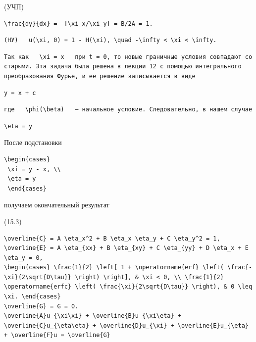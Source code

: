 \documentclass[
  ukrainian,
]{article}
\begin{document}
(УЧП)

\begin{verbatim}
\frac{dy}{dx} = -[\xi_x/\xi_y] = B/2A = 1.
\end{verbatim}

\begin{verbatim}
(НУ)   u(\xi, 0) = 1 - H(\xi), \quad -\infty < \xi < \infty.
\end{verbatim}

\begin{verbatim}
Так как   \xi = x   при t = 0, то новые граничные условия совпадают со старыми. Эта задача была решена в лекции 12 с помощью интегрального преобразования Фурье, и ее решение записывается в виде
\end{verbatim}

\begin{verbatim}
y = x + c
\end{verbatim}

\begin{verbatim}
где   \phi(\beta)   — начальное условие. Следовательно, в нашем случае
\end{verbatim}

\begin{verbatim}
\eta = y
\end{verbatim}

После подстановки

\begin{verbatim}
\begin{cases}
 \xi = y - x, \\
 \eta = y
 \end{cases}
\end{verbatim}

получаем окончательный результат

(15.3)

\begin{verbatim}
\overline{C} = A \eta_x^2 + B \eta_x \eta_y + C \eta_y^2 = 1,
\overline{E} = A \eta_{xx} + B \eta_{xy} + C \eta_{yy} + D \eta_x + E \eta_y = 0,
\begin{cases} \frac{1}{2} \left[ 1 + \operatorname{erf} \left( \frac{-\xi}{2\sqrt{D\tau}} \right) \right], & \xi < 0, \\ \frac{1}{2} \operatorname{erfc} \left( \frac{\xi}{2\sqrt{D\tau}} \right), & 0 \leq \xi. \end{cases}
\overline{G} = G = 0.
\overline{A}u_{\xi\xi} + \overline{B}u_{\xi\eta} + \overline{C}u_{\eta\eta} + \overline{D}u_{\xi} + \overline{E}u_{\eta} + \overline{F}u = \overline{G}
\end{verbatim}
\end{document}
